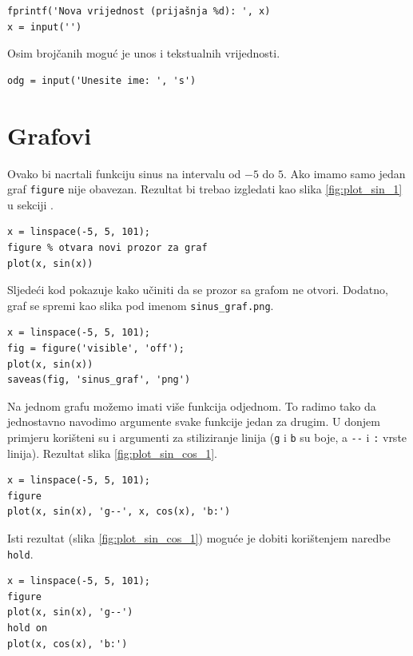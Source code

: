 \documentclass[a4paper, 10pt]{article}
\newcommand{\spec}[1]{\texttt{#1}} %
\begin{document}
\begin{lstlisting}
fprintf('Nova vrijednost (prijašnja %d): ', x)
x = input('')
\end{lstlisting}

Osim brojčanih moguć je unos i tekstualnih vrijednosti.

\begin{lstlisting}
odg = input('Unesite ime: ', 's')
\end{lstlisting}


\section{Grafovi}

Ovako bi nacrtali funkciju sinus na intervalu od $-5$ do $5$.
Ako imamo samo jedan graf \spec{figure} nije obavezan.
Rezultat bi trebao izgledati kao slika \ref{fig:plot_sin_1} u sekciji .

\begin{lstlisting}
x = linspace(-5, 5, 101);
figure % otvara novi prozor za graf
plot(x, sin(x))
\end{lstlisting}

Sljedeći kod pokazuje kako učiniti da se prozor sa grafom ne otvori.
Dodatno, graf se spremi kao slika pod imenom \spec{sinus\_graf.png}.

\begin{lstlisting}
x = linspace(-5, 5, 101);
fig = figure('visible', 'off');
plot(x, sin(x))
saveas(fig, 'sinus_graf', 'png')
\end{lstlisting}

Na jednom grafu možemo imati više funkcija odjednom.
To radimo tako da jednostavno navodimo argumente svake funkcije jedan za drugim.
U donjem primjeru korišteni su i argumenti za stiliziranje linija (\spec{g} i \spec{b} su boje, a \spec{-{}-} i \spec{:} vrste linija).
Rezultat slika \ref{fig:plot_sin_cos_1}.

\begin{lstlisting}
x = linspace(-5, 5, 101);
figure
plot(x, sin(x), 'g--', x, cos(x), 'b:')
\end{lstlisting}

Isti rezultat (slika \ref{fig:plot_sin_cos_1}) moguće je dobiti korištenjem naredbe \spec{hold}.

\begin{lstlisting}
x = linspace(-5, 5, 101);
figure
plot(x, sin(x), 'g--')
hold on
plot(x, cos(x), 'b:')
\end{lstlisting}
\end{document}

